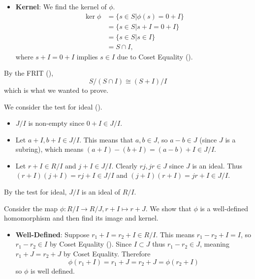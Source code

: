 \begin{questions}
\begin{partquestions}{\roman*}
\begin{itemize}
            \item \textbf{Kernel}: We find the kernel of $\phi$.
            \begin{align*}
                \ker\phi &= \{s \in S \vert \phi(s) = 0 + I\}\\
                &= \{s \in S \vert s + I = 0 + I\}\\
                &= \{s \in S \vert s \in I\}\\
                &= S \cap I,
            \end{align*}
            where $s + I = 0 + I$ implies $s \in I$ due to Coset Equality ().
        \end{itemize}

        By the FRIT (),
        \[
            S/(S\cap I) \cong (S+I)/I
        \]
        which is what we wanted to prove.
    \end{partquestions}

    \item \begin{partquestions}{\roman*}
        \item We consider the test for ideal ().
        \begin{itemize}
            \item $J/I$ is non-empty since $0+I \in J/I$.
            \item Let $a+I,b+I \in J/I$. This means that $a,b \in J$, so $a - b \in J$ (since $J$ is a subring), which means $(a+I) - (b+I) = (a-b) + I \in J/I$.
            \item Let $r+I \in R/I$ and $j+I \in J/I$. Clearly $rj, jr \in J$ since $J$ is an ideal. Thus $(r+I)(j+I) = rj + I \in J/I$ and $(j+I)(r+I) = jr + I \in J/I$.
        \end{itemize}
        By the test for ideal, $J/I$ is an ideal of $R/I$.

        \item Consider the map $\phi: R/I \to R/J, r+I\mapsto r+J$. We show that $\phi$ is a well-defined homomorphism and then find its image and kernel.
        \begin{itemize}
            \item \textbf{Well-Defined}: Suppose $r_1 + I = r_2 + I \in R/I$. This means $r_1 - r_2 + I = I$, so $r_1 - r_2 \in I$ by Coset Equality (). Since $I \subset J$ thus $r_1 - r_2 \in J$, meaning $r_1 + J = r_2 + J$ by Coset Equality. Therefore
            \[
                \phi(r_1 + I) = r_1 + J = r_2 + J = \phi(r_2 + I)
            \]
            so $\phi$ is well defined.


\end{itemize}
\end{partquestions}
\end{questions}
